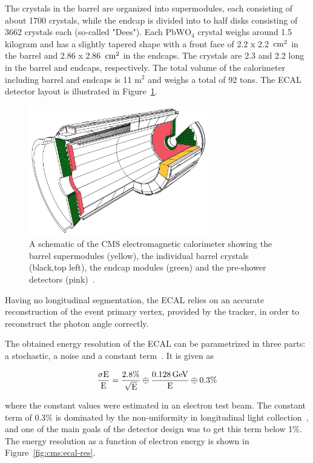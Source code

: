 The  crystals in the barrel are organized into supermodules, each consisting of about 1700 crystals, while the endcap is divided into to half disks consisting of 3662 crystals each (so-called "Dees").
Each $\textrm{PbWO}_4$ crystal weighs around 1.5 kilogram and has a slightly tapered shape with a front face of 2.2 x 2.2 $\,\text{cm}^2$ in the barrel and 2.86 x 2.86 $\,\text{cm}^2$ in the endcaps. The crystals are 2.3 and 2.2 \cm long in the barrel and endcaps, respectively. The total volume of the calorimeter including barrel and endcaps is 11 $\textrm{m}^2$ and weighs a total of 92 tons.
The ECAL detector layout is illustrated in Figure~\ref{fig:cms:ecal}.


\begin{figure}[h] 
    \centering
    \includegraphics[width=0.7\textwidth]{figures/cms/ecal.jpg}
    \caption{A schematic of the CMS electromagnetic calorimeter showing the barrel supermodules (yellow), the individual barrel crystals (black,top left), the endcap modules (green) and the pre-shower detectors (pink)~\cite{Chatrchyan:2008aa}.}
    \label{fig:cms:ecal}
\end{figure}

Having no longitudinal segmentation, the ECAL relies on an accurate reconstruction of the event primary vertex, provided by the tracker, in order to reconstruct the photon angle correctly.

The obtained energy resolution of the ECAL can be parametrized in three parts: a stochastic, a noise and a constant term~\cite{Adzic:2007mi}. It is given as

\begin{equation*}
  \frac{\sigma \textrm{E}}{\textrm{E}} = \frac{2.8 \%}{\sqrt{\textrm{E}}}\oplus\frac{0.128 \,\text{Ge\hspace{-.08em}V}}{\textrm{E}}\oplus 0.3 \%
\end{equation*}

where the constant values were estimated in an electron test beam. The constant term of $0.3 \%$ is dominated by the non-uniformity in longitudinal light collection~\cite{1742-6596-587-1-012001}, and one of the main goals of the detector design was to get this term below 1\%. The energy resolution as a function of electron energy is shown in Figure~\ref{fig:cms:ecal-res}.

